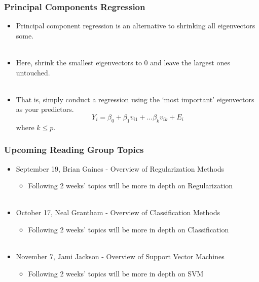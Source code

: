 \documentclass[hide notes,red,handout]{beamer}
\begin{document}
\begin{frame}[t]
\frametitle{Principal Components Regression}
\begin{itemize}
\item Principal component regression is an alternative to shrinking all eigenvectors some.\\~\\\pause
\item Here, shrink the smallest eigenvectors to 0 and leave the largest ones untouched.\\~\\
\item That is, simply conduct a regression using the `most important' eigenvectors as your predictors.
$$Y_i=\beta_0+\beta_1v_{i1}+...\beta_kv_{ik}+E_i$$
where $k\leq p$.
\end{itemize}
\end{frame}



\begin{frame}[t]
\frametitle{Upcoming Reading Group Topics}
\begin{itemize}
\item September 19, Brian Gaines - Overview of Regularization Methods\\
\begin{itemize}
\item Following 2 weeks' topics will be more in depth on Regularization\\~\\\pause
\end{itemize}
\item October 17, Neal Grantham - Overview of Classification Methods\\
\begin{itemize}
\item Following 2 weeks' topics will be more in depth on Classification\\~\\\pause
\end{itemize}
\item November 7, Jami Jackson - Overview of Support Vector Machines\\
\begin{itemize}
\item Following 2 weeks' topics will be more in depth on SVM
\end{itemize}
\end{itemize}
\end{frame}
\end{document}
